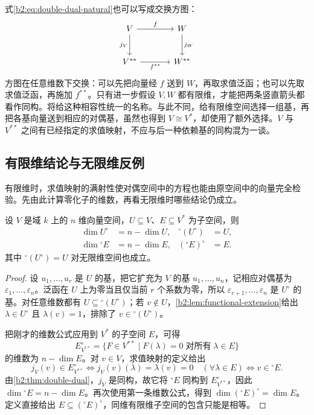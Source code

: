 式\eqref{b2:eq:double-dual-natural}也可以写成交换方图：
\[
	\begin{tikzcd}[column sep=3.5em,row sep=2.5em]
		V\arrow[r,"f"]\arrow[d,"j_V"']&W\arrow[d,"j_W"]\\
		V^{**}\arrow[r,"f^{**}"']&W^{**}
	\end{tikzcd}
\]
方图在任意维数下交换：可以先把向量经 \(f\) 送到 \(W\)，再取求值泛函；也可以先取求值泛函，再施加 \(f^{**}\)。只有进一步假设 \(V,W\) 都有限维，才能把两条竖直箭头都看作同构。将给这种相容性统一的名称。与此不同，给有限维空间选择一组基，再把各基向量送到相应的对偶基，虽然也得到 \(V\cong V^*\)，却使用了额外选择。\(V\) 与 \(V^{**}\) 之间有已经指定的求值映射，不应与后一种依赖基的同构混为一谈。

\subsection{有限维结论与无限维反例}
\label{b2:subsec:0102:03}

有限维时，求值映射的满射性使对偶空间中的方程也能由原空间中的向量完全检验。先由此计算零化子的维数，再看无限维时哪些结论仍成立。

\begin{corollary}[有限维零化子的维数]\label{b2:cor:annihilator-dimension}
	设 \(V\) 是域 \(k\) 上的 \(n\) 维向量空间，\(U\subseteq V\)、\(E\subseteq V^*\) 为子空间，则
	\[
		\begin{aligned}
			\dim U^\circ&=n-\dim U,&{}^\circ(U^\circ)&=U,\\
			\dim{}^\circ E&=n-\dim E,&({}^\circ E)^\circ&=E.
		\end{aligned}
	\]
	其中 \({}^\circ(U^\circ)=U\) 对无限维空间也成立。
\end{corollary}

\begin{proof}
	设 \(u_1,\ldots,u_r\) 是 \(U\) 的基，把它扩充为 \(V\) 的基 \(u_1,\ldots,u_n\)，记相应对偶基为 \(\varepsilon_1,\ldots,\varepsilon_n\)。泛函在 \(U\) 上为零当且仅当前 \(r\) 个系数为零，所以 \(\varepsilon_{r+1},\ldots,\varepsilon_n\) 是 \(U^\circ\) 的基。对任意维数都有 \(U\subseteq{}^\circ(U^\circ)\)；若 \(v\notin U\)，\cref{b2:lem:functional-extension}给出 \(\lambda\in U^\circ\) 且 \(\lambda(v)=1\)，排除了 \(v\in{}^\circ(U^\circ)\)。

	把刚才的维数公式应用到 \(V^*\) 的子空间 \(E\)，可得
	\[
		E^\circ_{V^{**}}=\{F\in V^{**}\mid F(\lambda)=0\;\text{对所有}\;\lambda\in E\}
	\]
	的维数为 \(n-\dim E\)。对 \(v\in V\)，求值映射的定义给出
	\[
		j_V(v)\in E^\circ_{V^{**}} \iff j_V(v)(\lambda)=\lambda(v)=0\quad(\forall\lambda\in E) \iff v\in{}^\circ E.
	\]
	由\cref{b2:thm:double-dual}，\(j_V\) 是同构，故它将 \({}^\circ E\) 同构到 \(E^\circ_{V^{**}}\)，因此 \(\dim{}^\circ E=n-\dim E\)。再次使用第一条维数公式，得到 \(\dim({}^\circ E)^\circ=\dim E\)。定义直接给出 \(E\subseteq({}^\circ E)^\circ\)，同维有限维子空间的包含只能是相等。
\end{proof}

